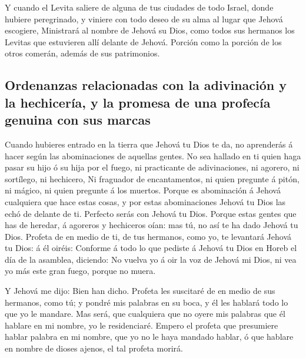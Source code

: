  Y cuando el Levita saliere de alguna de tus ciudades de
todo Israel, donde hubiere peregrinado, y viniere con todo deseo de su
alma al lugar que Jehová escogiere,  Ministrará al nombre de
Jehová su Dios, como todos sus hermanos los Levitas que estuvieren allí
delante de Jehová.  Porción como la porción de los otros
comerán, además de sus patrimonios.

\hypertarget{ordenanzas-relacionadas-con-la-adivinaciuxf3n-y-la-hechiceruxeda-y-la-promesa-de-una-profecuxeda-genuina-con-sus-marcas}{%
\subsection{Ordenanzas relacionadas con la adivinación y la hechicería,
y la promesa de una profecía genuina con sus
marcas}\label{ordenanzas-relacionadas-con-la-adivinaciuxf3n-y-la-hechiceruxeda-y-la-promesa-de-una-profecuxeda-genuina-con-sus-marcas}}

 Cuando hubieres entrado en la tierra que Jehová tu Dios te
da, no aprenderás á hacer según las abominaciones de aquellas gentes.
 No sea hallado en ti quien haga pasar su hijo ó su hija
por el fuego, ni practicante de adivinaciones, ni agorero, ni sortílego,
ni hechicero,  Ni fraguador de encantamentos, ni quien
pregunte á pitón, ni mágico, ni quien pregunte á los muertos.
 Porque es abominación á Jehová cualquiera que hace estas
cosas, y por estas abominaciones Jehová tu Dios las echó de delante de
ti.  Perfecto serás con Jehová tu Dios. 
Porque estas gentes que has de heredar, á agoreros y hechiceros oían:
mas tú, no así te ha dado Jehová tu Dios.  Profeta de en
medio de ti, de tus hermanos, como yo, te levantará Jehová tu Dios: á él
oiréis:  Conforme á todo lo que pediste á Jehová tu Dios en
Horeb el día de la asamblea, diciendo: No vuelva yo á oir la voz de
Jehová mi Dios, ni vea yo más este gran fuego, porque no muera.

 Y Jehová me dijo: Bien han dicho.  Profeta
les suscitaré de en medio de sus hermanos, como tú; y pondré mis
palabras en su boca, y él les hablará todo lo que yo le mandare.
 Mas será, que cualquiera que no oyere mis palabras que él
hablare en mi nombre, yo le residenciaré.  Empero el
profeta que presumiere hablar palabra en mi nombre, que yo no le haya
mandado hablar, ó que hablare en nombre de dioses ajenos, el tal profeta
morirá.

